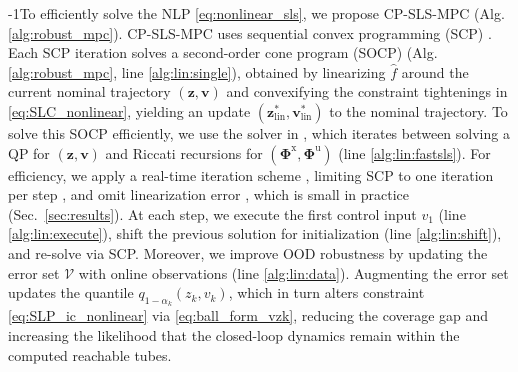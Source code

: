 \documentclass{l4dc2026}
\renewcommand{\l}{_\textrm{lin}}
\newcommand{\method}{CP-SLS-MPC }
\newcommand{\Z}{\mathbf{z}}
\newcommand{\V}{\mathbf{v}}
\newcommand{\Px}{\bm{\Phi}^{\mathrm{x}}}
\newcommand{\Pu}{\bm{\Phi}^{\mathrm{u}}}
\begin{document}
\looseness-1To efficiently solve the NLP \eqref{eq:nonlinear_sls}, we propose \method (Alg. \ref{alg:robust_mpc}). \method uses sequential convex programming (SCP) \citep{malyuta2022convex,messerer2021survey}. Each SCP iteration solves a second-order cone program (SOCP) (Alg. \ref{alg:robust_mpc}, line \ref{alg:lin:single}), obtained by linearizing $\hat f$ around the current nominal trajectory $(\textbf{z}, \textbf{v})$ and convexifying the constraint tightenings in \eqref{eq:SLC_nonlinear}, yielding an update $(\Z\l^*, \V\l^*)$ to the nominal trajectory. 
To solve this SOCP efficiently, we use the solver in \cite{leeman2024fast}, which iterates between solving a QP for $(\mathbf{z}, \mathbf{v})$ and Riccati recursions for $(\Px, \Pu)$ (line \ref{alg:lin:fastsls}). For efficiency, we apply a real-time iteration scheme \citep{Gros02012020}, limiting SCP to one iteration per step \citep{leeman2025guaranteed}, and omit linearization error \citep{zhan2025robustly}, which is small in practice (Sec.~\ref{sec:results}). At each step, we execute the first control input $v_1$ (line \ref{alg:lin:execute}), shift the previous solution for initialization (line \ref{alg:lin:shift}), and re-solve via SCP. Moreover, we improve OOD robustness by updating the error set $\mathcal{V}$ with online observations (line \ref{alg:lin:data}). Augmenting the error set updates the quantile $q_{1-\alpha_k}(z_k, v_k)$, which in turn alters constraint \eqref{eq:SLP_ic_nonlinear} via \eqref{eq:ball_form_vzk}, reducing the coverage gap and increasing the likelihood that the closed-loop dynamics remain within the computed reachable tubes.
\end{document}
